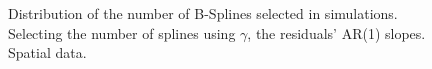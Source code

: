 \documentclass[
]{article}
\begin{document}
\begin{figure}

\begin{minipage}[t]{0.50\linewidth}

{\centering 


}

\end{minipage}%
%
\begin{minipage}[t]{0.50\linewidth}

{\centering 


}

\end{minipage}%

\caption{\label{fig-gamma-splines}Distribution of the number of
B-Splines selected in simulations. Selecting the number of splines using
\(\gamma\), the residuals' AR(1) slopes. Spatial data.}

\end{figure}
\newpage
\hypertarget{tbl-gamma-ts}{}
\end{document}

